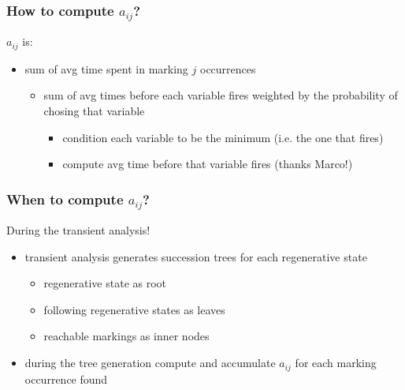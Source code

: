 \begin{frame}
  \frametitle{How to compute $a_{ij}$?}
  \alert{$a_{ij}$} is:
  \begin{itemize}
  \item<1-> sum of avg \alert{time spent} in marking $j$ occurrences
    \begin{itemize}
    \item<2-> \alert{sum} of avg times before each variable fires \alert{weighted} by the
      probability of chosing that variable
      \begin{itemize}
      \item<3-> \alert{condition} each variable to be the minimum (i.e. the one
        that fires)
      \item<4-> compute avg time \alert{before} that variable fires (thanks Marco!)
      \end{itemize}
    \end{itemize}
  \end{itemize}
  \begin{center}
  \end{center}
\end{frame}

\begin{frame}
  \frametitle{When to compute $a_{ij}$?}
  During the transient analysis!
  \begin{itemize}
  \item transient analysis generates succession trees for each
    regenerative state
    \begin{itemize}
    \item regenerative state as root
    \item following regenerative states as leaves
    \item reachable markings as inner nodes
    \end{itemize}
  \item during the tree generation compute and accumulate $a_{ij}$ for
    each marking occurrence found
  \end{itemize}
\end{frame}
